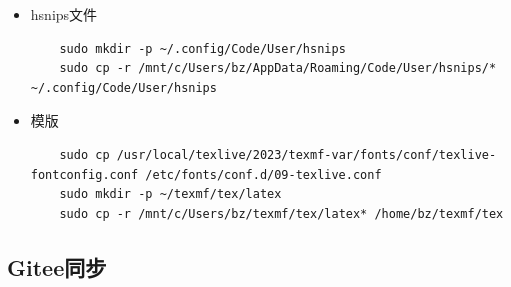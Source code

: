 \begin{itemize}
  \item hsnips文件
  
  \begin{lstlisting}
    sudo mkdir -p ~/.config/Code/User/hsnips
    sudo cp -r /mnt/c/Users/bz/AppData/Roaming/Code/User/hsnips/* ~/.config/Code/User/hsnips
  \end{lstlisting}
  \item 模版
  
  \begin{lstlisting}
    sudo cp /usr/local/texlive/2023/texmf-var/fonts/conf/texlive-fontconfig.conf /etc/fonts/conf.d/09-texlive.conf
    sudo mkdir -p ~/texmf/tex/latex
    sudo cp -r /mnt/c/Users/bz/texmf/tex/latex* /home/bz/texmf/tex
  \end{lstlisting}
\end{itemize}

\subsection{Gitee同步}

